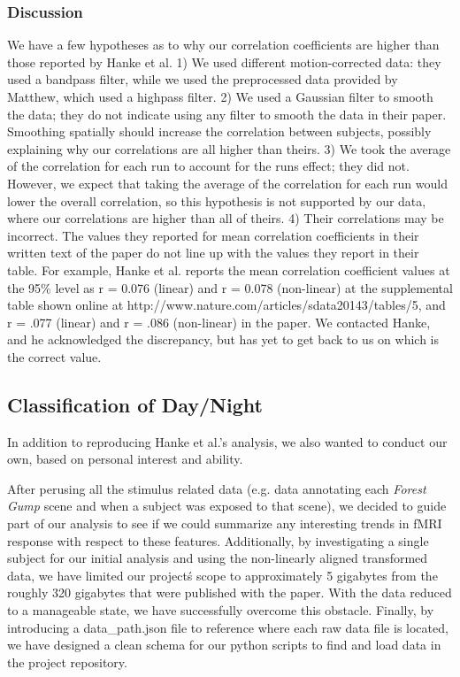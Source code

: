 \documentclass[11pt]{article}
\begin{document}
\subsubsection{Discussion}

We have a few hypotheses as to why our correlation coefficients are 
higher than those reported by Hanke et al.  1) We used 
different motion-corrected data: they used a bandpass filter, while we 
used the preprocessed data provided by Matthew, which used a highpass
filter.  2) We used a Gaussian filter to smooth the data; they do not 
indicate using any filter to smooth the data in their paper.  Smoothing 
spatially should increase the correlation between subjects, possibly 
explaining why our correlations are all higher than theirs.  3) We 
took the average of the correlation for each run to account for the runs
effect; they did not.  However, we expect that taking the average of 
the correlation for each run would lower the overall correlation, so
this hypothesis is not supported by our data, where our correlations
are higher than all of theirs.   4) Their correlations may be incorrect.
The values they reported for mean correlation coefficients in their 
written text of the paper do not line up with the values they report in 
their table.  For example, Hanke et al. reports the mean correlation 
coefficient values at the 95\% level as r = 0.076 (linear) and r = 0.078 
(non-linear) at the supplemental table shown online at
http://www.nature.com/articles/sdata20143/tables/5, and r = .077 (linear) 
and r = .086 (non-linear) in the paper.  We contacted Hanke, and he acknowledged 
the discrepancy, but has yet to get back to us on which is the correct value.  

\subsection{Classification of Day/Night}

In addition to reproducing Hanke et al.'s analysis, we also wanted to
conduct our own, based on personal interest and ability.

After perusing all the stimulus related data (e.g. data annotating each 
\emph{Forest Gump} scene and when a subject was exposed to
that scene), we decided to guide part of our analysis to see if we could
summarize any interesting trends in fMRI response with respect to these
features. Additionally, by investigating a single subject for our initial
analysis  and using the non-linearly aligned transformed data, we have limited
our project\'s scope to approximately 5 gigabytes from the roughly 320
gigabytes that were published with the paper. With the data reduced to a
manageable state, we have successfully overcome this obstacle. Finally, by
introducing a data\_path.json file to reference where each raw data file is
located, we have designed a clean schema for our python scripts to find and
load data in the project repository.
\end{document}
